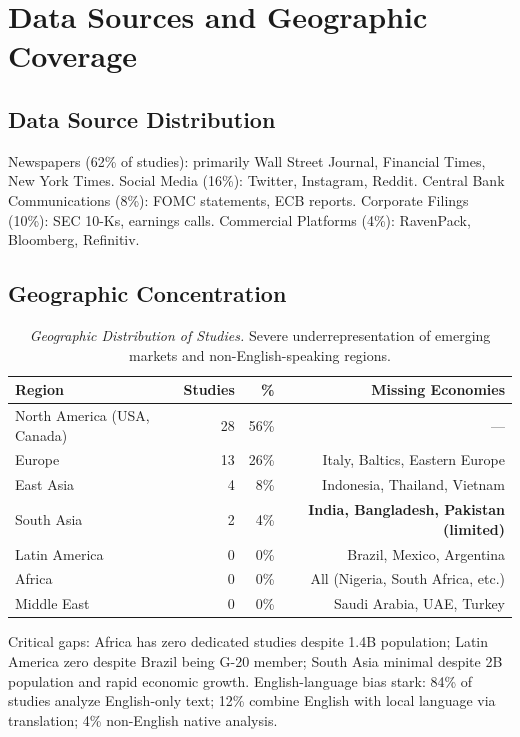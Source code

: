 \documentclass[11pt]{article}
\begin{document}
\section{Data Sources and Geographic Coverage}

\subsection{Data Source Distribution}

Newspapers (62\% of studies): primarily Wall Street Journal, Financial Times, New York Times.
Social Media (16\%): Twitter, Instagram, Reddit.
Central Bank Communications (8\%): FOMC statements, ECB reports.
Corporate Filings (10\%): SEC 10-Ks, earnings calls.
Commercial Platforms (4\%): RavenPack, Bloomberg, Refinitiv.

\subsection{Geographic Concentration}

\begin{table}[H]
\centering
\small
\begin{tabular}{lrrr}
\toprule
\textbf{Region} & \textbf{Studies} & \textbf{\%} & \textbf{Missing Economies} \\
\midrule
North America (USA, Canada) & 28 & 56\% & — \\
Europe & 13 & 26\% & Italy, Baltics, Eastern Europe \\
East Asia & 4 & 8\% & Indonesia, Thailand, Vietnam \\
South Asia & 2 & 4\% & \textbf{India, Bangladesh, Pakistan (limited)} \\
Latin America & 0 & 0\% & Brazil, Mexico, Argentina \\
Africa & 0 & 0\% & All (Nigeria, South Africa, etc.) \\
Middle East & 0 & 0\% & Saudi Arabia, UAE, Turkey \\
\bottomrule
\end{tabular}
\caption{\textit{Geographic Distribution of Studies.} Severe underrepresentation of emerging markets and non-English-speaking regions.}
\label{tab:geographic}
\end{table}

Critical gaps: Africa has zero dedicated studies despite 1.4B population; Latin America zero despite Brazil being G-20 member; South Asia minimal despite 2B population and rapid economic growth. English-language bias stark: 84\% of studies analyze English-only text; 12\% combine English with local language via translation; 4\% non-English native analysis.
\end{document}
